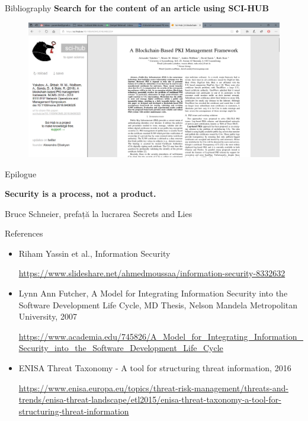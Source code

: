 \documentclass[pdf]{beamer}
\begin{document}
\begin{frame}{Bibliography}
\textbf{Search for the content of an article using SCI-HUB}
\begin{figure}[t]
\centering
\includegraphics[scale=0.3]{Images/d}
\end{figure}
\end{frame}



\begin{frame}{Epilogue}

\begin{center}
\textbf{Security is a process, not a product.}
\end{center}

Bruce Schneier, prefață la lucrarea Secrets and Lies

\end{frame}



\begin{frame}{References}
\begin{itemize}
\item
Riham Yassin et al., Information Security

\url{https://www.slideshare.net/ahmedmoussaa/information-security-8332632}

\item
Lynn Ann Futcher, A Model for Integrating Information Security into the Software Development Life Cycle, MD Thesis, Nelson Mandela Metropolitan University, 2007

\url{https://www.academia.edu/745826/A_Model_for_Integrating_Information_Security_into_the_Software_Development_Life_Cycle}

\item
ENISA Threat Taxonomy - A tool for structuring threat information, 2016 

\url{https://www.enisa.europa.eu/topics/threat-risk-management/threats-and-trends/enisa-threat-landscape/etl2015/enisa-threat-taxonomy-a-tool-for-structuring-threat-information}
\end{itemize}
\end{frame}
\end{document}
